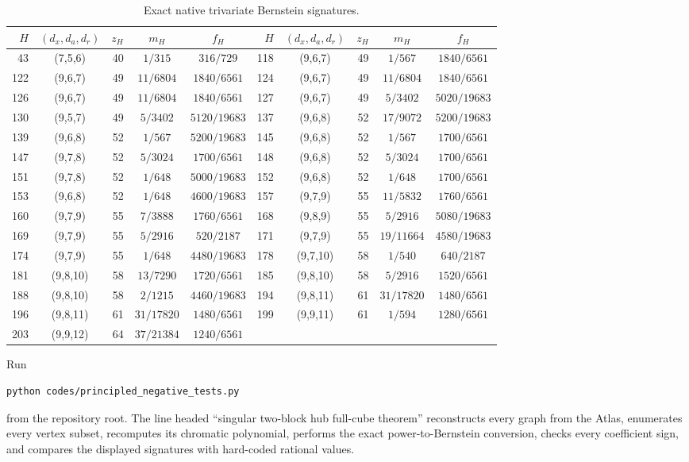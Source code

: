 \documentclass[11pt]{article}
\begin{document}
\begin{table}[ht]
\centering
\scriptsize
\begin{tabular}{r|c|r|c|c@{\qquad}r|c|r|c|c}
$H$&$(d_x,d_a,d_r)$&$z_H$&$m_H$&$f_H$&
$H$&$(d_x,d_a,d_r)$&$z_H$&$m_H$&$f_H$\\ \hline
43&(7,5,6)&40&$1/315$&$316/729$&118&(9,6,7)&49&$1/567$&$1840/6561$\\
122&(9,6,7)&49&$11/6804$&$1840/6561$&124&(9,6,7)&49&$11/6804$&$1840/6561$\\
126&(9,6,7)&49&$11/6804$&$1840/6561$&127&(9,6,7)&49&$5/3402$&$5020/19683$\\
130&(9,5,7)&49&$5/3402$&$5120/19683$&137&(9,6,8)&52&$17/9072$&$5200/19683$\\
139&(9,6,8)&52&$1/567$&$5200/19683$&145&(9,6,8)&52&$1/567$&$1700/6561$\\
147&(9,7,8)&52&$5/3024$&$1700/6561$&148&(9,6,8)&52&$5/3024$&$1700/6561$\\
151&(9,7,8)&52&$1/648$&$5000/19683$&152&(9,6,8)&52&$1/648$&$1700/6561$\\
153&(9,6,8)&52&$1/648$&$4600/19683$&157&(9,7,9)&55&$11/5832$&$1760/6561$\\
160&(9,7,9)&55&$7/3888$&$1760/6561$&168&(9,8,9)&55&$5/2916$&$5080/19683$\\
169&(9,7,9)&55&$5/2916$&$520/2187$&171&(9,7,9)&55&$19/11664$&$4580/19683$\\
174&(9,7,9)&55&$1/648$&$4480/19683$&178&(9,7,10)&58&$1/540$&$640/2187$\\
181&(9,8,10)&58&$13/7290$&$1720/6561$&185&(9,8,10)&58&$5/2916$&$1520/6561$\\
188&(9,8,10)&58&$2/1215$&$4460/19683$&194&(9,8,11)&61&$31/17820$&$1480/6561$\\
196&(9,8,11)&61&$31/17820$&$1480/6561$&199&(9,9,11)&61&$1/594$&$1280/6561$\\
203&(9,9,12)&64&$37/21384$&$1240/6561$&&&&&
\end{tabular}
\caption{Exact native trivariate Bernstein signatures.}
\label{tab:certificates}
\end{table}

Run
\begin{verbatim}
python codes/principled_negative_tests.py
\end{verbatim}
from the repository root.  The line headed ``singular two-block hub
full-cube theorem'' reconstructs every graph from the Atlas, enumerates every
vertex subset, recomputes its chromatic polynomial, performs the exact
power-to-Bernstein conversion, checks every coefficient sign, and compares
the displayed signatures with hard-coded rational values.
\end{document}
